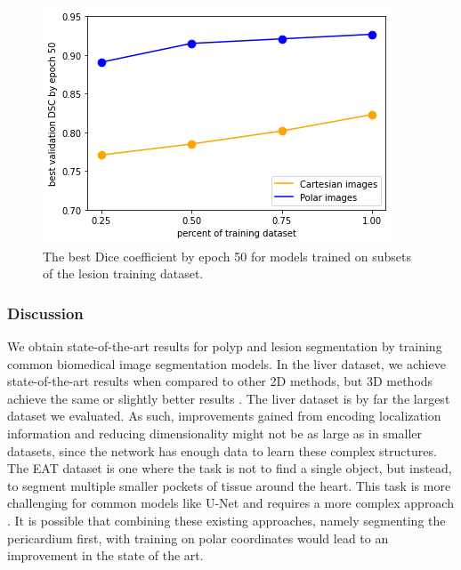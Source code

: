 	\clearpage
	
			\begin{figure}[t!]
		\centering
		\includegraphics[width=0.65\linewidth]{images/4/dsc-vs-dataset-percent}
		\caption{The best Dice coefficient by epoch 50 for models trained on subsets of the lesion training dataset. \cite{bencevicTrainingPolarImage2021}}
		\label{fig:dataset-vs-dsc}
	\end{figure}
	
		\subsubsection{Discussion}
	
We obtain state-of-the-art results for polyp and lesion segmentation by training common biomedical image segmentation models. In the liver dataset, we achieve state-of-the-art results when compared to other 2D methods, but 3D methods 
achieve the same or slightly better results \cite{valanarasuKiUNetOvercompleteConvolutional2020a}. 
The liver dataset is 
by far the largest dataset we evaluated. As such, improvements gained from 
encoding localization information and reducing dimensionality might not be as large as in smaller 
datasets, since the network has enough data to learn these complex structures.
The EAT dataset is one where the task is not to find a single object, but instead, to segment multiple smaller 
pockets of tissue around the heart. This task is more challenging for common models like U-Net and 
requires a more complex approach \cite{zhangAutomaticEpicardialFat2020a}. It is possible that combining 
these existing approaches, namely segmenting the pericardium first, with training on polar coordinates 
would lead to an improvement in the state of the art.

